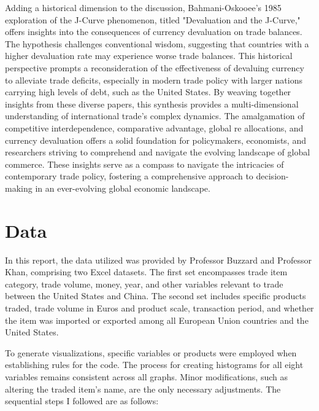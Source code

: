 \documentclass[12pt]{article}
\begin{document}
Adding a historical dimension to the discussion, Bahmani-Oskooee's 1985 exploration of the J-Curve phenomenon, titled "Devaluation and the J-Curve," offers insights into the consequences of currency devaluation on trade balances. The hypothesis challenges conventional wisdom, suggesting that countries with a higher devaluation rate may experience worse trade balances. This historical perspective prompts a reconsideration of the effectiveness of devaluing currency to alleviate trade deficits, especially in modern trade policy with larger nations carrying high levels of debt, such as the United States. By weaving together insights from these diverse papers, this synthesis provides a multi-dimensional understanding of international trade's complex dynamics. The amalgamation of competitive interdependence, comparative advantage, global re allocations, and currency devaluation offers a solid foundation for policymakers, economists, and researchers striving to comprehend and navigate the evolving landscape of global commerce. These insights serve as a compass to navigate the intricacies of contemporary trade policy, fostering a comprehensive approach to decision-making in an ever-evolving global economic landscape.





\section{Data}
\label{sec:data}



In this report, the data utilized was provided by Professor Buzzard and Professor Khan, comprising two Excel datasets. The first set encompasses trade item category, trade volume, money, year, and other variables relevant to trade between the United States and China. The second set includes specific products traded, trade volume in Euros and product scale, transaction period, and whether the item was imported or exported among all European Union countries and the United States.

To generate visualizations, specific variables or products were employed when establishing rules for the code. The process for creating histograms for all eight variables remains consistent across all graphs. Minor modifications, such as altering the traded item's name, are the only necessary adjustments. The sequential steps I followed are as follows:
\end{document}
